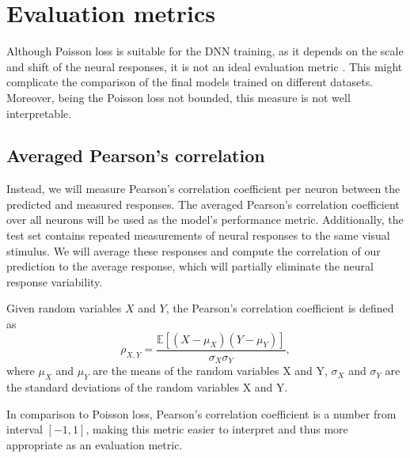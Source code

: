 \section{Evaluation metrics}

Although Poisson loss is suitable for the DNN training, as it depends on the scale and shift of the neural responses, it is not an ideal evaluation metric \citep{willeke2022sensorium}. This might complicate the comparison of the final models trained on different datasets. Moreover, being the Poisson loss not bounded, this measure is not well interpretable.

\subsection{Averaged Pearson’s correlation}


Instead, we will measure Pearson’s correlation coefficient per neuron between the predicted and measured responses. The averaged Pearson’s correlation coefficient over all neurons will be used as the model’s performance metric. Additionally, the test set contains repeated measurements of neural responses to the same visual stimulus. We will average these responses and compute the correlation of our prediction to the average response, which will partially eliminate the neural response variability.

\begin{defn}\label{def01:9}
	Given random variables $X$ and $Y$, the Pearson's correlation coefficient is defined as
	\begin{equation}
		\rho_{X, Y} = \frac{\mathbb{E}\left[(X - \mu_X)(Y - \mu_Y)\right]}{\sigma_X \sigma_Y},
	\end{equation}
	where $\mu_X$ and $\mu_Y$ are the means of the random variables X and Y, $\sigma_X$ and $\sigma_Y$ are the standard deviations of the random variables X and Y.
\end{defn}


In comparison to Poisson loss, Pearson’s correlation coefficient is a number from interval $[-1, 1]$, making this metric easier to interpret and thus more appropriate as an evaluation metric.










